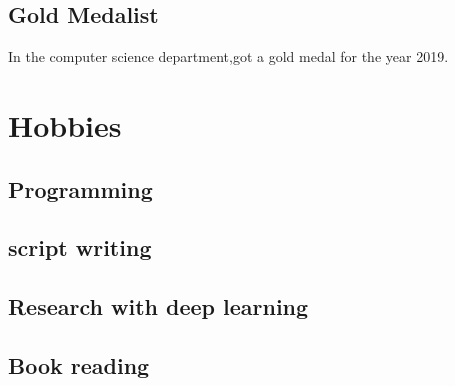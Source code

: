 \documentclass[
	10pt, %
]{FreemanCV}
\begin{document}
\begin{paracol}{2}
\subsection{Gold Medalist}
In the computer science department,got a gold medal for the year 2019.

\medskip %

\section{Hobbies}





\subsection{Programming}
\subsection{script writing}
\subsection{Research with deep learning}
\subsection{Book reading}




\end{paracol}
\end{document}
